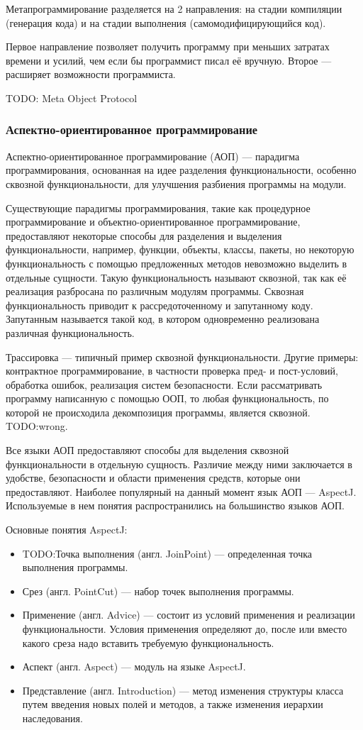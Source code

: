 \documentclass[a4paper,12pt]{article}
\begin{document}
Метапрограммирование разделяется на 2 направления: на стадии
компиляции (генерация кода) и на стадии выполнения (самомодифицирующийся код).

Первое направление позволяет получить программу при меньших затратах времени и
усилий, чем если бы программист писал её вручную. Второе — расширяет
возможности программиста.

TODO: Meta Object Protocol

\subsubsection{Аспектно-ориентированное программирование}
\label{aop}
Аспектно-ориентированное программирование (АОП) — парадигма программирования,
основанная на идее разделения функциональности, особенно сквозной
функциональности, для улучшения разбиения программы на модули.

Существующие парадигмы программирования, такие как процедурное программирование
и объектно-ориентированное программирование, предоставляют некоторые способы
для разделения и выделения функциональности, например, функции, объекты,
классы, пакеты, но некоторую функциональность с помощью предложенных методов
невозможно выделить в отдельные сущности. Такую функциональность называют
сквозной, так как её реализация разбросана по различным модулям программы.
Сквозная функциональность приводит к рассредоточенному и запутанному коду.
Запутанным называется такой код, в котором одновременно реализована различная
функциональность.

Трассировка — типичный пример сквозной функциональности. Другие примеры:
контрактное программирование, в частности проверка пред- и пост-условий,
обработка ошибок, реализация систем безопасности. Если рассматривать программу
написанную с помощью ООП, то любая функциональность, по которой не происходила
декомпозиция программы, является сквозной. TODO:wrong.

Все языки АОП предоставляют способы для выделения сквозной функциональности в
отдельную сущность. Различие между ними заключается в удобстве, безопасности и
области применения средств, которые они предоставляют. Наиболее популярный на
данный момент язык АОП — AspectJ. Используемые в нем понятия распространились
на большинство языков АОП.

Основные понятия AspectJ:
\begin{itemize}
 \item TODO:Точка выполнения (англ. JoinPoint) — определенная точка выполнения
 программы.
 \item Срез (англ. PointCut) — набор точек выполнения программы.
 \item Применение (англ. Advice) — состоит из условий применения и реализации
 функциональности. Условия применения определяют до, после или вместо какого
 среза надо вставить требуемую функциональность.  
 \item Аспект (англ. Aspect) — модуль на языке AspectJ.
 \item Представление (англ. Introduction) — метод изменения структуры класса
 путем введения новых полей и методов, а также изменения иерархии наследования.
\end{itemize}
\end{document}
